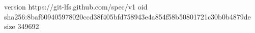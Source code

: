 version https://git-lfs.github.com/spec/v1
oid sha256:8baf609405978020ccd38f405bfd758943e4a854f58b50801721c30b0b4879de
size 349692
